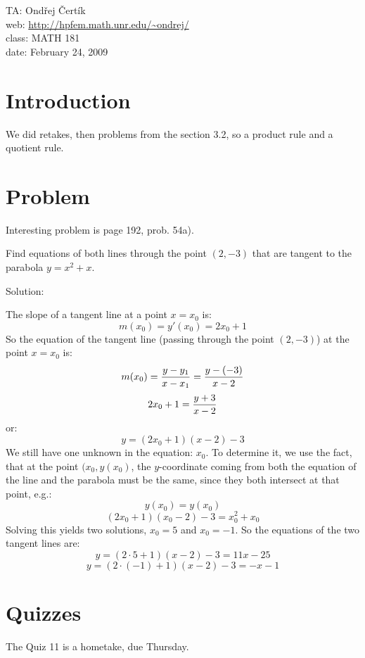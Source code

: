 \documentclass[10pt]{article}
\begin{document}
\noindent TA: Ondřej Čertík\\
web: \url{http://hpfem.math.unr.edu/~ondrej/}\\
class: MATH 181\\
date: February 24, 2009

\section{Introduction}

We did retakes, then problems from the section 3.2, so a product rule and a
quotient rule.

\section{Problem}

Interesting problem is page 192, prob. 54a).

Find equations of both lines through the point $(2, -3)$ that are tangent to
the parabola $y=x^2+x$.

Solution:

The slope of a tangent line at a point $x=x_0$ is:
$$m(x_0) = y'(x_0) = 2x_0+1$$
So the equation of the tangent line (passing through the point $(2, -3)$) at the point $x=x_0$ is:
$$m(x_0) = {y-y_1\over x-x_1} = {y-(-3)\over x-2}$$
$$2x_0 +1 = {y+3\over x-2}$$
or:
$$y = (2x_0+1)(x-2)-3$$
We still have one unknown in the equation: $x_0$. To determine it, we use the
fact, that at the point $(x_0, y(x_0)$, the $y$-coordinate coming from both the
equation of the line and the parabola must be the same, since they both
intersect at that point, e.g.:
$$y(x_0) = y(x_0)$$
$$(2x_0+1)(x_0-2)-3=x_0^2+x_0$$
Solving this yields two solutions, $x_0 = 5$ and $x_0 = -1$. So the equations
of the two tangent lines are:
$$y = (2\cdot 5+1)(x-2)-3 = 11x-25$$
$$y = (2\cdot (-1)+1)(x-2)-3 = -x-1$$

\section{Quizzes}

The Quiz 11 is a hometake, due Thursday.
\end{document}
